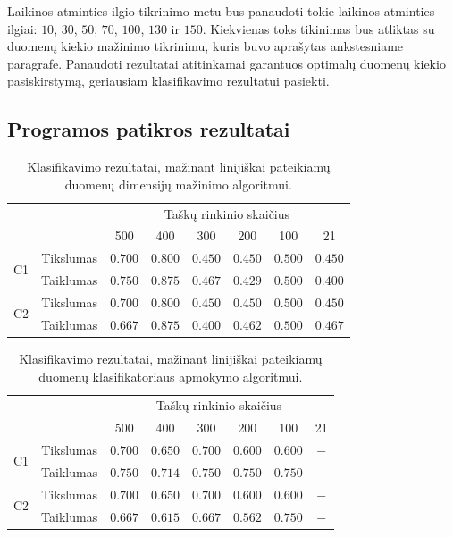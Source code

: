 \documentclass[]{vgtuef}
\begin{document}
Laikinos atminties ilgio tikrinimo metu bus panaudoti tokie laikinos atminties ilgiai: $10$, $30$, $50$, $70$, $100$, $130$ ir $150$. Kiekvienas toks tikinimas bus atliktas su duomenų kiekio mažinimo tikrinimu, kuris buvo aprašytas ankstesniame paragrafe. Panaudoti rezultatai atitinkamai garantuos optimalų duomenų kiekio pasiskirstymą, geriausiam klasifikavimo rezultatui pasiekti.


\subsection{Programos patikros rezultatai}
\begin{table}
	\centering
	\caption{Klasifikavimo rezultatai, mažinant linijiškai pateikiamų duomenų dimensijų mažinimo algoritmui.}
	\label{table:first_phase_experiment}
	\begin{tabular}{|c|c|c|c|c|c|c|c|} \hline
			& & \multicolumn{6}{c|}{Taškų rinkinio skaičius} \\ \cline{3-8}
						&	& 500 	& 400	& 300 	& 200 & 100 	& 21 	\\ \hline
		\multirow{2}{*}{C1}
		& Tikslumas	& $0.700$ & $\mathbf{0.800}$	 & $0.450$ & $0.450$ & $0.500$ & $0.450$ \\ \cline{2-8}
		& Taiklumas  &	$0.750$ & $\mathbf{0.875}$ & $0.467$ & $0.429$ & $0.500$ & $0.400$ \\ \hline
		\multirow{2}{*}{C2}
		& Tikslumas	& $0.700$ & $\mathbf{0.800}$	 & $0.450$ & $0.450$ & $0.500$ & $0.450$ \\ \cline{2-8}
		& Taiklumas  &	$0.667$ & $\mathbf{0.875}$ & $0.400$ & $0.462$ & $0.500$ & $0.467$ \\ \hline
	\end{tabular}
\end{table}

\begin{table}
	\centering
	\caption{Klasifikavimo rezultatai, mažinant linijiškai pateikiamų duomenų klasifikatoriaus apmokymo algoritmui.}
	\label{table:second_phase_experiment}
	\begin{tabular}{|c|c|c|c|c|c|c|c|} \hline
			& & \multicolumn{6}{c|}{Taškų rinkinio skaičius} \\ \cline{3-8}
						&	& 500 	& 400	& 300 	& 200 & 100 	& 21 	\\ \hline
		\multirow{2}{*}{C1}
		& Tikslumas	& $\mathbf{0.700}$ & $0.650$ & $\mathbf{0.700}$ & $0.600$ & $0.600$ & $-$ \\ \cline{2-8}
		& Taiklumas  &	$\mathbf{0.750}$ & $0.714$ & $\mathbf{0.750}$ & $0.750$ & $0.750$ & $-$ \\ \hline
		\multirow{2}{*}{C2}
		& Tikslumas	& $\mathbf{0.700}$ & $0.650$ & $\mathbf{0.700}$ & $0.600$ & $0.600$ & $-$ \\ \cline{2-8}
		& Taiklumas  &	$\mathbf{0.667}$ & $0.615$ & $\mathbf{0.667}$ & $0.562$ & $0.750$ & $-$ \\ \hline
	\end{tabular}
\end{table}
\end{document}
